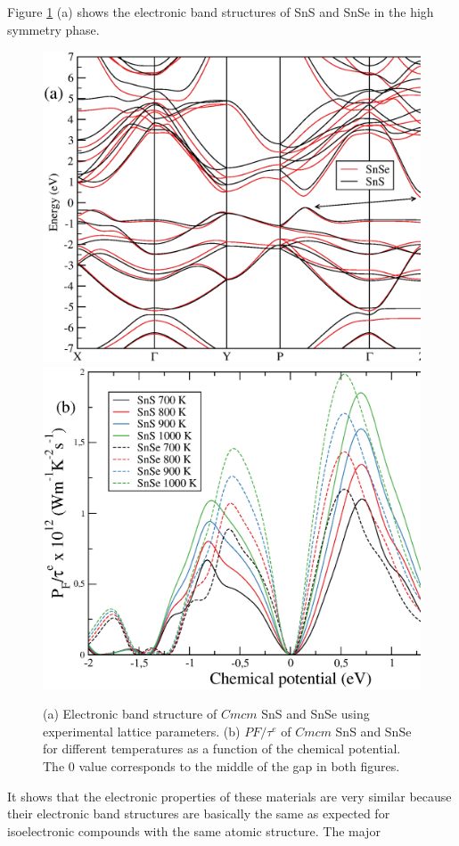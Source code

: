 Figure \ref{bands} (a) shows the electronic band structures of SnS and SnSe in the high symmetry phase.
\begin{figure}[h]
\begin{center}
\includegraphics[width=0.8\linewidth]{Figures/bands.eps}
\includegraphics[width=0.8\linewidth]{Figures/PF.eps}
\caption[Band structure and $P_{F}$ of SnS and SnSe.]{(a) Electronic band structure of $Cmcm$ SnS and SnSe using experimental lattice parameters. (b) $PF/\tau^{e}$ of $Cmcm$ SnS and SnSe for different temperatures as a function of the 
chemical potential. The $0$ value corresponds to the middle of the gap in both figures.}
\label{bands}
\end{center}
\end{figure}
It shows that the electronic properties of these materials are very similar because their electronic band structures are basically the same as expected for isoelectronic compounds with the same atomic structure. The major
